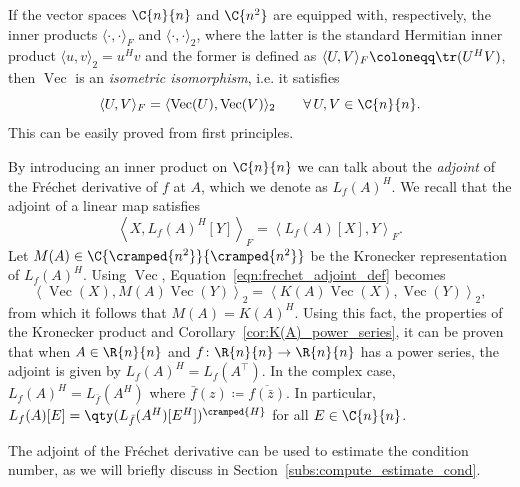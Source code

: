 If the vector spaces $\C{n}{n}$ and $\C{n^2}$ are equipped with, respectively, the inner products 
$\langle\cdot,\cdot\rangle_F$ and $\langle\cdot,\cdot\rangle_2$, where the latter is the 
standard Hermitian inner product $\langle u,v\rangle_2=u^{H}v$
and the former is defined as $\langle U,V\rangle_F\coloneqq\tr(U^{H}V)$, 
then $\operatorname{Vec}$ is an \emph{isometric isomorphism}, i.e. it satisfies
\begin{equation}\label{eqn:vec_isometry}
	\langle U,V\rangle_F = \langle\operatorname{Vec}(U),\operatorname{Vec}(V)\rangle_2\qquad\forall\,U,V\in\C{n}{n}.
\end{equation}
This can be easily proved from first principles.

By introducing an inner product on $\C{n}{n}$ we can talk about the \emph{adjoint} of the 
Fréchet derivative of $f$ at $A$, which we denote as $L_f(A)^{H}$. We recall that the
adjoint of a linear map satisfies
\begin{equation}\label{eqn:frechet_adjoint_def}
	\left\langle X,L_f(A)^{H}[Y]\right\rangle_F = \left\langle L_f(A)[X],Y\right\rangle_F.
\end{equation}
Let $M(A)\in\C{\cramped{n^2}}{\cramped{n^2}}$ be the Kronecker representation of $L_f(A)^{H}$.
Using $\operatorname{Vec}$, Equation~\eqref{eqn:frechet_adjoint_def} becomes
\[
	\left\langle\operatorname{Vec}(X),M(A)\operatorname{Vec}(Y)\right\rangle_2 = 
	\left\langle K(A)\operatorname{Vec}(X),\operatorname{Vec}(Y)\right\rangle_2,
\]
from which it follows that $M(A)=K(A)^{H}$. Using this fact, the properties of the Kronecker product and Corollary~\ref{cor:K(A)_power_series}, it can be proven that when $A\in\R{n}{n}$ and $f\colon\R{n}{n}\to\R{n}{n}$ has a power series, the adjoint is given by $L_f(A)^{H}=L_f(A^{\top})$. In the complex case, $L_f(A)^{H}=L_{\bar{f}}(A^{H})$ where $\bar{f}(z)\coloneqq\overline{f(\bar{z})}$. In particular,
$L_f(A)[E]=\qty(L_{\bar{f}}(A^{H})[E^{H}])^{\cramped{H}}$ for all $E\in\C{n}{n}$.

The adjoint of the Fréchet derivative can be used to estimate the condition number, as we will briefly discuss in Section~\ref{subs:compute_estimate_cond}. 

